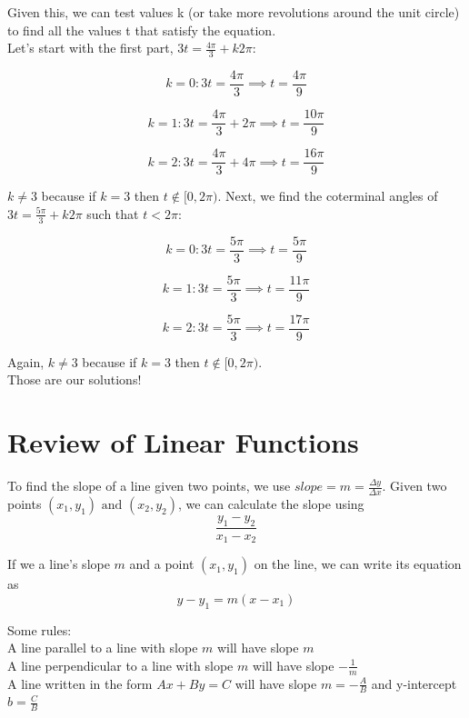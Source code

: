 \documentclass[12pt]{article}
\begin{document}
Given this, we can test values k (or take more revolutions around the unit circle) to find all the values t that satisfy the equation.\\

Let's start with the first part, \(3t=\frac{4\pi}{3}+k2\pi\):

\[k=0: 3t=\frac{4\pi}{3}\implies \boxed{t=\frac{4\pi}{9}}\]

\[k=1: 3t=\frac{4\pi}{3}+2\pi\implies \boxed{t=\frac{10\pi}{9}}\]

\[k=2: 3t=\frac{4\pi}{3}+4\pi\implies \boxed{t=\frac{16\pi}{9}}\]

\(k\neq3\) because if \(k=3\) then \(t\notin[0,2\pi)\). Next, we find the coterminal angles of \(3t=\frac{5\pi}{3}+k2\pi\) such that \(t<2\pi\):

\[k=0: 3t=\frac{5\pi}{3}\implies \boxed{t=\frac{5\pi}{9}}\]

\[k=1: 3t=\frac{5\pi}{3}\implies \boxed{t=\frac{11\pi}{9}}\]

\[k=2: 3t=\frac{5\pi}{3}\implies \boxed{t=\frac{17\pi}{9}}\]

Again, \(k\neq3\) because if \(k=3\) then \(t\notin[0,2\pi)\).\\

Those are our solutions!

\section{Review of Linear Functions}

To find the slope of a line given two points, we use \(slope = m = \frac{\Delta y}{\Delta x}\). Given two points \((x_1,y_1) \text{ and } (x_2, y_2)\), we can calculate the slope using\\

\[\frac{y_1-y_2}{x_1-x_2}\]

If we a line's slope \(m\) and a point \((x_1,y_1)\) on the line, we can write its equation as\\

\[y-y_1=m(x-x_1)\]

Some rules:\\
A line parallel to a line with slope \(m\) will have slope \(m\)\\
A line perpendicular to a line with slope \(m\) will have slope \(-\frac{1}{m}\)\\
A line written in the form \(Ax+By=C\) will have slope \(m=-\frac{A}{B}\) and y-intercept \(b=\frac{C}{B}\)\\
\end{document}
